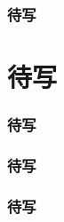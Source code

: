 \begin{frame}
\frametitle{待写}

\end{frame}


\section{待写}


\begin{frame}
\frametitle{待写}

\end{frame}


\begin{frame}
\frametitle{待写}

\end{frame}


\begin{frame}
\frametitle{待写}

\end{frame}




